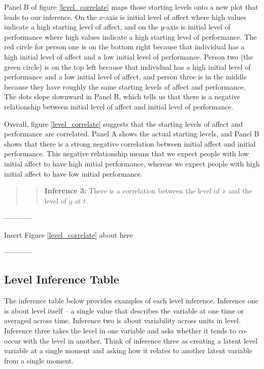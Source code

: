 \documentclass[english,,man]{apa6}
\theoremstyle{definition}
\theoremstyle{definition}
\theoremstyle{definition}
\theoremstyle{remark}
\begin{document}
Panel B of figure \ref{level_correlate} maps those starting levels onto
a new plot that leads to our inference. On the \(x\)-axis is initial
level of affect where high values indicate a high starting level of
affect, and on the \(y\)-axis is initial level of performance where high
values indicate a high starting level of performance. The red circle for
person one is on the bottom right because that individual has a high
initial level of affect and a low initial level of performance. Person
two (the green circle) is on the top left because that individual has a
high initial level of performance and a low initial level of affect, and
person three is in the middle because they have roughly the same
starting levels of affect and performance. The dots slope downward in
Panel B, which tells us that there is a negative relationship between
initial level of affect and initial level of performance.

Overall, figure \ref{level_correlate} suggests that the starting levels
of affect and performance are correlated. Panel A shows the actual
starting levels, and Panel B shows that there is a strong negative
correlation between initial affect and initial performance. This
negative relationship means that we expect people with low initial
affect to have high initial performance, whereas we expect people with
high initial affect to have low initial performance.

\begin{quote}
\begin{quote}
\textbf{Inference 3:} There is a correlation between the level of \(x\)
and the level of \(y\) at \(t\).
\end{quote}
\end{quote}

\begin{center}

------------

Insert Figure \ref{level_correlate} about here

------------

\end{center}

\hypertarget{level-inference-table}{%
\subsection{Level Inference Table}\label{level-inference-table}}

The inference table below provides examples of each level inference.
Inference one is about level itself -- a single value that describes the
variable at one time or averaged across time. Inference two is about
variability across units in level. Inference three takes the level in
one variable and asks whether it tends to co-occur with the level in
another. Think of inference three as creating a latent level variable at
a single moment and asking how it relates to another latent variable
from a single moment.
\end{document}
